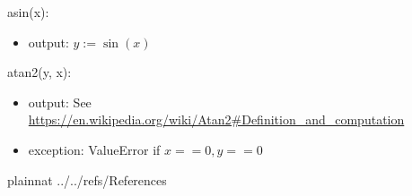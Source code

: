 \documentclass[12pt, titlepage]{article}
\begin{document}
\noindent asin(x):
\begin{itemize}
\item output: $y := \sin(x)$
\end{itemize}

\noindent atan2(y, x):
\begin{itemize}
\item output: See \url{https://en.wikipedia.org/wiki/Atan2#Definition_and_computation}
\item exception: ValueError if $x ==0, y ==0$
\end{itemize}

\newpage

 {plainnat}
 {../../refs/References}

\end{document}
